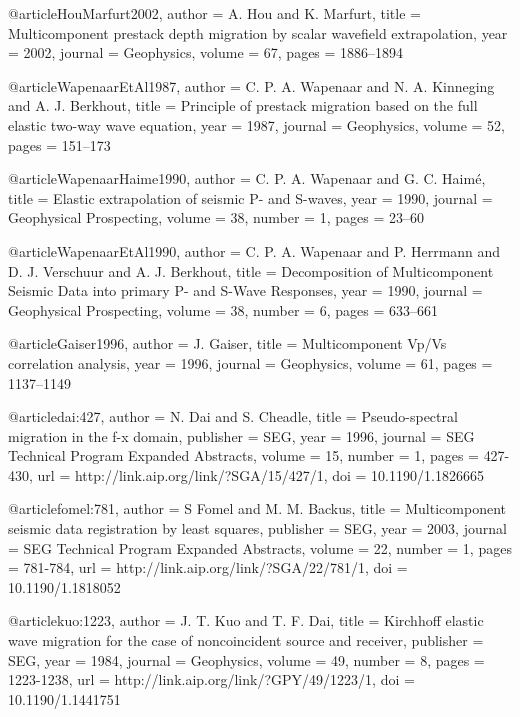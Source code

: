 {@article{HouMarfurt2002,
  author =	 {A. Hou and K. Marfurt},
  title =	 {Multicomponent prestack depth migration by scalar
                  wavefield extrapolation},
  year =	 2002,
  journal =	 {Geophysics},
  volume =	 67,
  pages =	 {1886--1894}
}

@article{WapenaarEtAl1987,
  author =	 {C. P. A. Wapenaar and N. A. Kinneging and
                  A. J. Berkhout},
  title =	 {Principle of prestack migration based on the full
                  elastic two-way wave equation},
  year =	 1987,
  journal =	 {Geophysics},
  volume =	 52,
  pages =	 {151--173}
}

@article{WapenaarHaime1990,
  author =	 {C. P. A. Wapenaar and G. C. Haim\'{e}},
  title =	 {Elastic extrapolation of seismic {P}- and {S}-waves},
  year =	 1990,
  journal =	 {Geophysical Prospecting},
  volume =	 38,
  number =	 1,
  pages =	 {23--60}
}

@article{WapenaarEtAl1990,
  author =	 {C. P. A. Wapenaar and P. Herrmann and
                  D. J. Verschuur and A. J. Berkhout},
  title =	 {Decomposition of Multicomponent Seismic Data into
                  primary {P}- and {S}-Wave Responses},
  year =	 1990,
  journal =	 {Geophysical Prospecting},
  volume =	 38,
  number =	 6,
  pages =	 {633--661}
}

@article{Gaiser1996,
  author =	 {J. Gaiser},
  title =	 {Multicomponent {V}p/{V}s correlation analysis},
  year =	 1996,
  journal =	 {Geophysics},
  volume =	 61,
  pages =	 {1137--1149}
}

@article{dai:427,
  author =	 {N. Dai and S. Cheadle},
  title =	 {Pseudo-spectral migration in the f-x domain},
  publisher =	 {SEG},
  year =	 1996,
  journal =	 {SEG Technical Program Expanded Abstracts},
  volume =	 15,
  number =	 1,
  pages =	 {427-430},
  url =		 {http://link.aip.org/link/?SGA/15/427/1},
  doi =		 {10.1190/1.1826665}
}

@article{fomel:781,
  author =	 {S Fomel and M. M. Backus},
  title =	 {Multicomponent seismic data registration by least
                  squares},
  publisher =	 {SEG},
  year =	 2003,
  journal =	 {SEG Technical Program Expanded Abstracts},
  volume =	 22,
  number =	 1,
  pages =	 {781-784},
  url =		 {http://link.aip.org/link/?SGA/22/781/1},
  doi =		 {10.1190/1.1818052}
}

@article{kuo:1223,
  author =	 {J. T. Kuo and T. F. Dai},
  title =	 {Kirchhoff elastic wave migration for the case of
                  noncoincident source and receiver},
  publisher =	 {SEG},
  year =	 1984,
  journal =	 {Geophysics},
  volume =	 49,
  number =	 8,
  pages =	 {1223-1238},
  url =		 {http://link.aip.org/link/?GPY/49/1223/1},
  doi =		 {10.1190/1.1441751}
}

}

